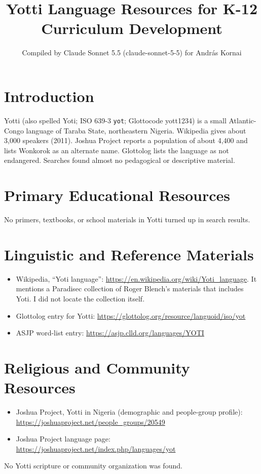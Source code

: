 \documentclass[12pt]{article}
\title{Yotti Language Resources for K-12 Curriculum Development}
\author{Compiled by Claude Sonnet 5.5 (claude-sonnet-5-5) for Andr\'as Kornai}
\date{}
\begin{document}
\maketitle

\section{Introduction}
Yotti (also spelled Yoti; ISO 639-3 \texttt{yot}; Glottocode yott1234) is a small Atlantic-Congo language of Taraba State, northeastern Nigeria. Wikipedia gives about 3,000 speakers (2011). Joshua Project reports a population of about 4,400 and lists Wonkorok as an alternate name. Glottolog lists the language as not endangered. Searches found almost no pedagogical or descriptive material.

\section{Primary Educational Resources}
No primers, textbooks, or school materials in Yotti turned up in search results.

\section{Linguistic and Reference Materials}
\begin{itemize}
\item Wikipedia, ``Yoti language'': \url{https://en.wikipedia.org/wiki/Yoti_language}. It mentions a Paradisec collection of Roger Blench's materials that includes Yoti. I did not locate the collection itself.
\item Glottolog entry for Yotti: \url{https://glottolog.org/resource/languoid/iso/yot}
\item ASJP word-list entry: \url{https://asjp.clld.org/languages/YOTI}
\end{itemize}

\section{Religious and Community Resources}
\begin{itemize}
\item Joshua Project, Yotti in Nigeria (demographic and people-group profile): \url{https://joshuaproject.net/people_groups/20549}
\item Joshua Project language page: \url{https://joshuaproject.net/index.php/languages/yot}
\end{itemize}
No Yotti scripture or community organization was found.
\end{document}
